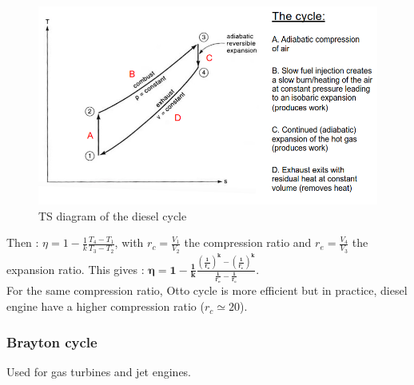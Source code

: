 \documentclass[../main.tex]{subfiles}
\begin{document}
\begin{figure}[hbt!]
    \centering
    \includegraphics[width=0.5\linewidth]{IMAGES/Renewable/Screenshot from 2025-03-04 15-42-47.png}
    \caption{TS diagram of the diesel cycle}
\end{figure}

Then : $\eta = 1-\frac{1}{k} \frac{T_4-T_1}{T_3-T_2}$, with $r_c = \frac{V_1}{V_2}$ the compression ratio and $r_e = \frac{V_4}{V_3}$ the expansion ratio. This gives : $\mathbf{\eta = 1-\frac{1}{k} \frac{(\frac{1}{r_e})^k-(\frac{1}{r_c})^k}{\frac{1}{r_e}-\frac{1}{r_c}}}$.\\
For the same compression ratio, Otto cycle is more efficient but in practice, diesel engine have a higher compression ratio ($r_c\simeq 20$).\\

\subsubsection{Brayton cycle}
Used for gas turbines and jet engines. \\
\end{document}
